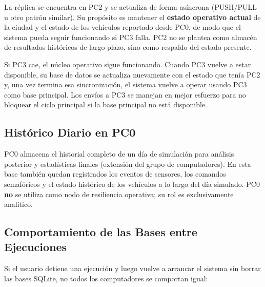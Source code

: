 \documentclass[12pt, a4paper]{article}
\let\oldtexttt\texttt
\renewcommand{\texttt}[1]{\oldtexttt{\seqsplit{#1}}}
\begin{document}
La réplica se encuentra en PC2 y se actualiza de forma asíncrona (PUSH/PULL u otro patrón similar). Su propósito es mantener el \textbf{estado operativo actual} de la ciudad y el estado de los vehículos reportado desde PC0, de modo que el sistema pueda seguir funcionando si PC3 falla. PC2 no se plantea como almacén de resultados históricos de largo plazo, sino como respaldo del estado presente.

Si PC3 cae, el núcleo operativo \texttt{PC0-PC1-PC2} sigue funcionando. Cuando PC3 vuelve a estar disponible, su base de datos se actualiza nuevamente con el estado que tenía PC2 y, una vez termina esa sincronización, el sistema vuelve a operar usando PC3 como base principal. Los envíos a PC3 se manejan en mejor esfuerzo para no bloquear el ciclo principal si la base principal no está disponible.

\subsection{Histórico Diario en PC0}

PC0 almacena el historial completo de un día de simulación para análisis posterior y estadísticas finales (extensión del grupo de computadores). En esta base también quedan registrados los eventos de sensores, los comandos semafóricos y el estado histórico de los vehículos a lo largo del día simulado. PC0 \textbf{no} se utiliza como nodo de resiliencia operativa; su rol es exclusivamente analítico.

\subsection{Comportamiento de las Bases entre Ejecuciones}

Si el usuario detiene una ejecución y luego vuelve a arrancar el sistema sin borrar las bases SQLite, no todos los computadores se comportan igual:
\end{document}
